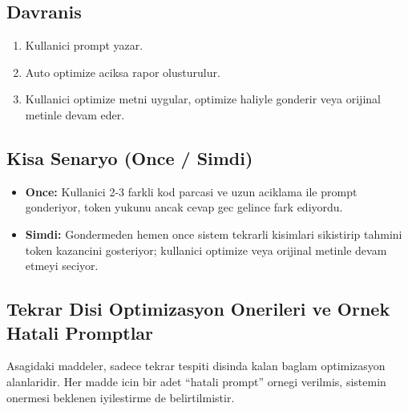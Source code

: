 \documentclass[12pt,a4paper]{article}
\begin{document}
\subsection{Davranis}
\begin{enumerate}[leftmargin=*]
  \item Kullanici prompt yazar.
  \item Auto optimize aciksa rapor olusturulur.
  \item Kullanici optimize metni uygular, optimize haliyle gonderir veya orijinal metinle devam eder.
\end{enumerate}

\subsection{Kisa Senaryo (Once / Simdi)}
\begin{itemize}[leftmargin=*]
  \item \textbf{Once:} Kullanici 2-3 farkli kod parcasi ve uzun aciklama ile prompt gonderiyor,
  token yukunu ancak cevap gec gelince fark ediyordu.
  \item \textbf{Simdi:} Gondermeden hemen once sistem tekrarli kisimlari sikistirip
  tahmini token kazancini gosteriyor; kullanici optimize veya orijinal metinle devam etmeyi seciyor.
\end{itemize}

\subsection{Tekrar Disi Optimizasyon Onerileri ve Ornek Hatali Promptlar}
Asagidaki maddeler, sadece tekrar tespiti disinda kalan baglam optimizasyon alanlaridir.
Her madde icin bir adet ``hatali prompt'' ornegi verilmis, sistemin onermesi beklenen iyilestirme de belirtilmistir.
\end{document}
